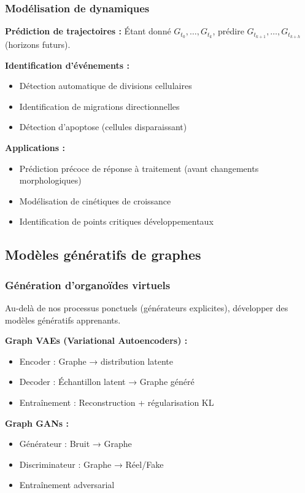 \subsubsection{Modélisation de dynamiques}

\textbf{Prédiction de trajectoires :}
Étant donné $G_{t_0}, \ldots, G_{t_k}$, prédire $G_{t_{k+1}}, \ldots, G_{t_{k+h}}$ (horizons futurs).

\textbf{Identification d'événements :}
\begin{itemize}
    \item Détection automatique de divisions cellulaires
    \item Identification de migrations directionnelles
    \item Détection d'apoptose (cellules disparaissant)
\end{itemize}

\textbf{Applications :}
\begin{itemize}
    \item Prédiction précoce de réponse à traitement (avant changements morphologiques)
    \item Modélisation de cinétiques de croissance
    \item Identification de points critiques développementaux
\end{itemize}

\subsection{Modèles génératifs de graphes}

\subsubsection{Génération d'organoïdes virtuels}

Au-delà de nos processus ponctuels (générateurs explicites), développer des modèles génératifs apprenants.

\textbf{Graph VAEs (Variational Autoencoders) :}
\begin{itemize}
    \item Encoder : Graphe → distribution latente
    \item Decoder : Échantillon latent → Graphe généré
    \item Entraînement : Reconstruction + régularisation KL
\end{itemize}

\textbf{Graph GANs :}
\begin{itemize}
    \item Générateur : Bruit → Graphe
    \item Discriminateur : Graphe → Réel/Fake
    \item Entraînement adversarial
\end{itemize}

